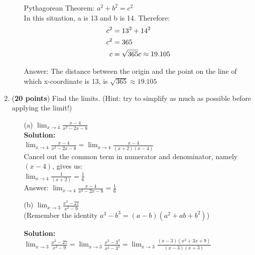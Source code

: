 \documentclass[a4paper]{article}
\begin{document}
\begin{enumerate}
\begin{itemize}
Pythagorean Theorem: $a^2 + b^2 = c^2$\\

In this situation, a is 13 and b is 14. Therefore:\\

\begin{align*}
	c^2 &= 13^2 + 14^2 \notag \\
	c^2 &=  365 \notag \\
	c &= \sqrt{365} \notag	
		c \approx 19.105
\end{align*}

Answer: The distance between the origin and the point on the line of which x-coordinate is 13, is $\sqrt{365} \approx 19.105$

\end{itemize}


\item (\textbf{20 points}) Find the limits. (Hint: try to simplify as much as possible before applying the limit!)


\begin{itemize}

	\item[(a)] $\lim_{x \to 4} \frac{x - 4}{x^2 - 2x - 8}$\\
	
	\textbf{Solution:}\\
	
	$\lim_{x \to 4} \frac{x - 4}{x^2 - 2x - 8} = \lim_{x \to 4} \frac{x - 4}{(x+2)(x-4)}$\\
	
	Cancel out the common term in numerator and denominator, namely $(x-4)$, gives us:\\
	
	$\lim_{x \to 4} \frac{1}{(x+2)} = \frac{1}{6}$\\	
	
	Answer: $\lim_{x \to 4} \frac{x - 4}{x^2 - 2x - 8} = \frac{1}{6}$\\
	
	\item[(b)] $\lim_{x \to 3} \frac{x^3 - 27}{x^2 -9}$\\
	(Remember the identity $a^3 - b^3 = (a - b)(a^2 + ab + b^2)$)	
	
	\textbf{Solution:}\\
	
	$\lim_{x \to 3} \frac{x^3 - 27}{x^2 -9} = \lim_{x \to 3} \frac{x^3 - 3^3}{x^2 -3^2} = \lim_{x \to 3} \frac{(x-3)(x^2 + 3x + 9)}{(x-3)(x+3)}$\\
	

\end{itemize}
\end{enumerate}
\end{document}
